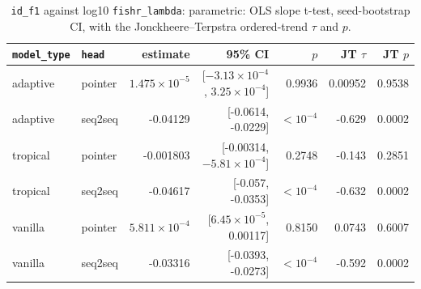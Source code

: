 \documentclass[10pt]{article}
\begin{document}
{\small
\begin{longtable}{llrrrrr}
\caption{\texttt{id\_f1} against log10 \texttt{fishr\_lambda}: parametric: OLS slope t-test, seed-bootstrap CI, with the Jonckheere--Terpstra ordered-trend $\tau$ and $p$.}\label{tab:trend-id_f1}\\
\toprule
\texttt{model\_type} & \texttt{head} & estimate & 95\% CI & $p$ & JT $\tau$ & JT $p$\\
\midrule
\endhead
adaptive & pointer & $1.475\times10^{-5}$ & [$-3.13\times10^{-4}$, $3.25\times10^{-4}$] & 0.9936 & 0.00952 & 0.9538\\
adaptive & seq2seq & -0.04129 & [-0.0614, -0.0229] & $<10^{-4}$ & -0.629 & 0.0002\\
tropical & pointer & -0.001803 & [-0.00314, $-5.81\times10^{-4}$] & 0.2748 & -0.143 & 0.2851\\
tropical & seq2seq & -0.04617 & [-0.057, -0.0353] & $<10^{-4}$ & -0.632 & 0.0002\\
vanilla & pointer & $5.811\times10^{-4}$ & [$6.45\times10^{-5}$, 0.00117] & 0.8150 & 0.0743 & 0.6007\\
vanilla & seq2seq & -0.03316 & [-0.0393, -0.0273] & $<10^{-4}$ & -0.592 & 0.0002\\
\bottomrule
\end{longtable}
}
\end{document}
